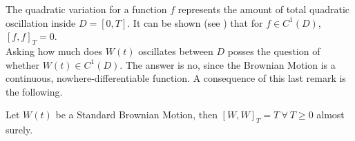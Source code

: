 \documentclass[../TGMAFFIRO]{subfiles}
\begin{document}
The quadratic variation for a function $f$ represents the amount of total quadratic oscillation inside $D = [0,T]$. It can be shown (see ) that for $f \in C^1(D)$, $[f,f]_T = 0$.\\

Asking how much does $W(t)$ oscillates between $D$ posses the question of whether $W(t) \in C^1(D)$. The answer is no, since the Brownian Motion is a continuous, nowhere-differentiable function. A consequence of this last remark is the following.

\begin{theorem}\label{th:quadratic_brownian_motion}
	Let $W(t)$ be a Standard Brownian Motion, then $[W, W]_T = T \ \forall \ T \geq 0$ almost surely.
\end{theorem}
\end{document}
